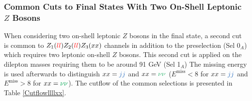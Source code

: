 \documentclass[a4paper,11pt]{article}
\begin{document}
    \subsubsection[Common Cuts to Final States With Two On-Shell Leptonic $Z$ Bosons]{Common Cuts to Final States With Two On-Shell Leptonic \boldmath$Z$ Bosons}
    When considering two on-shell leptonic $Z$ bosons in the final state, a second cut is common to $Z_1(\textcolor{red}{ll})Z_2(\textcolor{red}{ll})Z_3(xx)$ channels in addition to the preselection (Sel 0$_A$) which requires two leptonic on-shell $Z$ bosons. This second cut is applied on the dilepton masses requiring them to be around 91 GeV (Sel 1$_A$) The missing energy is used afterwards to distinguish $xx=\textcolor{NavyBlue}{jj}$ and $xx=\textcolor{Green}{\nu\nu}$ ($E^{\mbox{miss}}<8$ for $xx=\textcolor{NavyBlue}{jj}$ and $E^{\mbox{miss}}>8$ for $xx=\textcolor{Green}{\nu\nu}$). The cutflow of the common selections is presented in Table \ref{Cutflowllllxx}.
\end{document}
